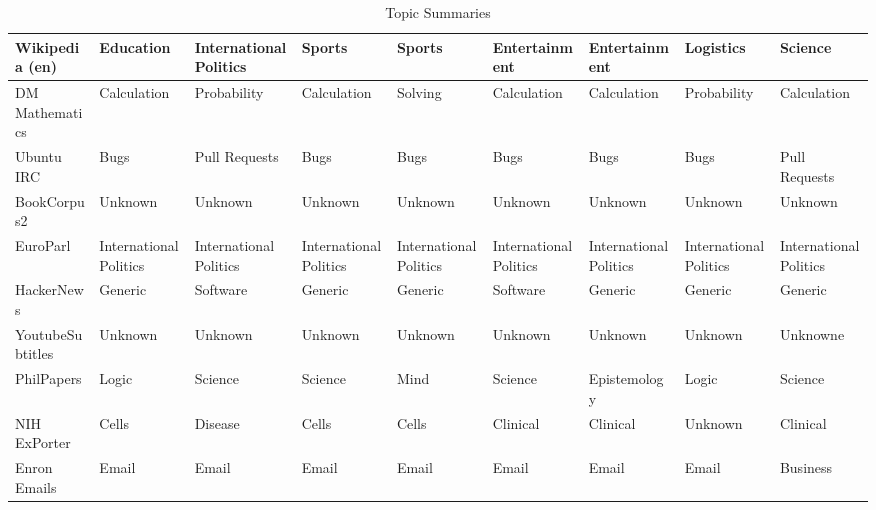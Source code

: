 \documentclass[11pt,a4paper]{article}
\begin{document}
\begin{appendices}
\begin{table*}[p]
\begin{tiny}
\begin{tabular}{|p{}|p{}p{}p{}p{}p{}p{}p{}p{}|}
Wikipedia (en) & Education & International Politics & Sports & Sports & Entertainment & Entertainment & Logistics & Science\\\hline
DM Mathematics & Calculation & Probability & Calculation & Solving & Calculation & Calculation & Probability & Calculation\\\hline
Ubuntu IRC & Bugs & Pull Requests & Bugs & Bugs & Bugs & Bugs & Bugs & Pull Requests\\\hline
BookCorpus2 & Unknown & Unknown & Unknown & Unknown & Unknown & Unknown & Unknown & Unknown\\\hline
EuroParl & International Politics & International Politics & International Politics & International Politics & International Politics & International Politics & International Politics & International Politics\\\hline
HackerNews & Generic & Software & Generic & Generic & Software & Generic & Generic & Generic\\\hline
YoutubeSubtitles & Unknown & Unknown & Unknown & Unknown & Unknown & Unknown & Unknown & Unknowne\\\hline
PhilPapers & Logic & Science & Science & Mind & Science & Epistemology & Logic & Science\\\hline
NIH ExPorter & Cells & Disease & Cells & Cells & Clinical & Clinical & Unknown & Clinical\\\hline
Enron Emails & Email & Email & Email & Email & Email & Email & Email & Business\\\hline
\end{tabular}
\caption{Topic Summaries}
\end{tiny}
\end{table*}


\end{appendices}
\end{document}
